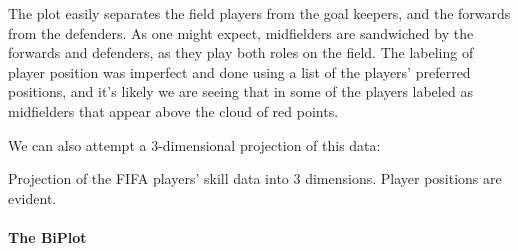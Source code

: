 \documentclass[
]{article}
\newenvironment{Shaded}{\begin{snugshade}}{\end{snugshade}}
\newcommand{\AttributeTok}[1]{\textcolor[rgb]{0.77,0.63,0.00}{#1}}
\newcommand{\DecValTok}[1]{\textcolor[rgb]{0.00,0.00,0.81}{#1}}
\newcommand{\FloatTok}[1]{\textcolor[rgb]{0.00,0.00,0.81}{#1}}
\newcommand{\FunctionTok}[1]{\textcolor[rgb]{0.00,0.00,0.00}{#1}}
\newcommand{\NormalTok}[1]{#1}
\newcommand{\OtherTok}[1]{\textcolor[rgb]{0.56,0.35,0.01}{#1}}
\newcommand{\SpecialCharTok}[1]{\textcolor[rgb]{0.00,0.00,0.00}{#1}}
\newcommand{\StringTok}[1]{\textcolor[rgb]{0.31,0.60,0.02}{#1}}
\theoremstyle{definition}
\theoremstyle{definition}
\theoremstyle{definition}
\theoremstyle{definition}
\theoremstyle{remark}
\begin{document}
The plot easily separates the field players from the goal keepers, and the forwards from the defenders. As one might expect, midfielders are sandwiched by the forwards and defenders, as they play both roles on the field. The labeling of player position was imperfect and done using a list of the players' preferred positions, and it's likely we are seeing that in some of the players labeled as midfielders that appear above the cloud of red points.

We can also attempt a 3-dimensional projection of this data:

\begin{Shaded}
\end{Shaded}

\hypertarget{htmlwidget-dd7effc5fe75e960d079}{}

\label{fig:unnamed-chunk-74}Projection of the FIFA players' skill data into 3 dimensions. Player positions are evident.

\hypertarget{the-biplot-2}{%
\paragraph{The BiPlot}\label{the-biplot-2}}
\end{document}
